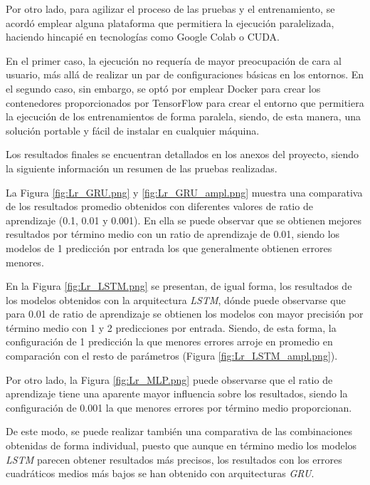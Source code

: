 Por otro lado, para agilizar el proceso de las pruebas y el entrenamiento, se acordó emplear alguna 
plataforma que permitiera la ejecución paralelizada, haciendo hincapié en tecnologías como Google Colab 
o CUDA.

En el primer caso, la ejecución no requería de mayor preocupación de cara al usuario, más allá de realizar un
par de configuraciones básicas en los entornos.
En el segundo caso, sin embargo, se optó por emplear Docker para crear los contenedores proporcionados por
TensorFlow para crear el entorno que permitiera la ejecución de los entrenamientos de forma paralela, siendo, de
esta manera, una solución portable y fácil de instalar en cualquier máquina.

Los resultados finales se encuentran detallados en los anexos del proyecto, siendo la siguiente 
información un resumen de las pruebas realizadas.

La Figura \ref{fig:Lr_GRU.png} y \ref{fig:Lr_GRU_ampl.png} muestra una comparativa de los resultados 
promedio obtenidos con diferentes valores de ratio de aprendizaje (0.1, 0.01 y 0.001).
En ella se puede observar que se obtienen mejores resultados por término medio con un ratio de
aprendizaje de 0.01, siendo los modelos de 1 predicción por entrada los que generalmente obtienen errores menores.

En la Figura \ref{fig:Lr_LSTM.png} se presentan, de igual forma, los resultados de los modelos 
obtenidos con la arquitectura \textit{LSTM}, dónde puede observarse que para 0.01 de ratio de aprendizaje 
se obtienen los modelos con mayor precisión por término medio con 1 y 2 predicciones por entrada. Siendo, 
de esta forma, la configuración de 1 predicción la que menores errores arroje en promedio en comparación 
con el resto de parámetros (Figura \ref{fig:Lr_LSTM_ampl.png}).

Por otro lado, la Figura \ref{fig:Lr_MLP.png} puede observarse que el ratio de aprendizaje tiene una 
aparente mayor influencia sobre los resultados, siendo la configuración de 0.001 la que menores errores 
por término medio proporcionan.

De este modo, se puede realizar también una comparativa de las combinaciones obtenidas de forma 
individual, puesto que aunque en término medio los modelos \textit{LSTM} parecen obtener resultados más
precisos, los resultados con los errores cuadráticos medios más bajos se han obtenido con arquitecturas
\textit{GRU}.

